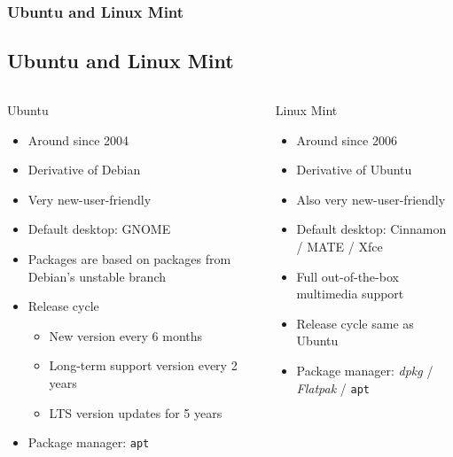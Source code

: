 \begin{frame}
	\frametitle{Ubuntu and Linux Mint}
	\subsection{Ubuntu and Linux Mint}
	
	\begin{columns}
		\begin{column}[t]{.45\linewidth}
			\begin{block}{Ubuntu}
				\begin{itemize}
					\item Around since 2004
					\item Derivative of Debian
					\item Very new-user-friendly
					\item Default desktop: GNOME
					\item Packages are based on packages from Debian's unstable branch
					\item Release cycle
						\begin{itemize}
							\item New version every 6 months
							\item Long-term support version every 2 years
							\item LTS version updates for 5 years
						\end{itemize}
					\item Package manager: \texttt{apt}
				\end{itemize}
			\end{block}
		\end{column}
		\hfill
		\begin{column}[t]{.45\linewidth}
			\begin{block}{Linux Mint}
				\begin{itemize}
					\item Around since 2006
					\item Derivative of Ubuntu
					\item Also very new-user-friendly
					\item Default desktop: Cinnamon / MATE / Xfce
					\item Full out-of-the-box multimedia support
					\item Release cycle same as Ubuntu
					\item Package manager: \textit{dpkg} / \textit{Flatpak} / \texttt{apt}
				\end{itemize}
			\end{block}
		\end{column}
	\end{columns}
	

\end{frame}
